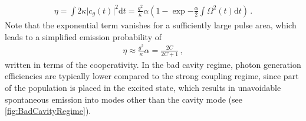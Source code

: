 \documentclass[../Thesis-IJspeert.tex]{subfiles}
\begin{document}
\begin{align}
 \eta = \int 2\kappa \vert c_g(t)\vert^2 \mathrm{d}t=\frac{g^2}{\kappa}\alpha \left( 1 -  \exp{-\frac{\alpha}{2} \int \Omega^2(t) \mathrm{d}t} \right)\,.
\end{align}
Note that the exponential term vanishes for a sufficiently large pulse area, which leads to a simplified emission probability of
\begin{align}
\eta\approx \frac{g^2}{\kappa}\alpha = \frac{2C}{2C+1}\,,
\end{align}
written in terms of the cooperativity. In the bad cavity regime, photon generation efficiencies are typically lower compared to the strong coupling regime, since part of the population is placed in the excited state, which results in unavoidable spontaneous emission into modes other than the cavity mode (see \autoref{fig:BadCavityRegime}).
\end{document}

